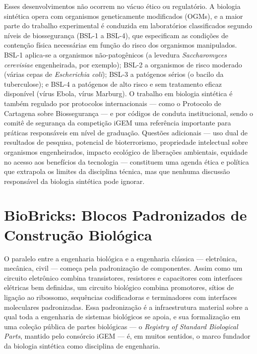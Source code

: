 Esses desenvolvimentos não ocorrem no vácuo ético ou regulatório. A biologia sintética opera com organismos geneticamente modificados (OGMs), e a maior parte do trabalho experimental é conduzida em laboratórios classificados segundo níveis de biossegurança (BSL-1 a BSL-4), que especificam as condições de contenção física necessárias em função do risco dos organismos manipulados. BSL-1 aplica-se a organismos não-patogênicos (a levedura \textit{Saccharomyces cerevisiae} engenheirada, por exemplo); BSL-2 a organismos de risco moderado (várias cepas de \textit{Escherichia coli}); BSL-3 a patógenos sérios (o bacilo da tuberculose); e BSL-4 a patógenos de alto risco e sem tratamento eficaz disponível (vírus Ebola, vírus Marburg). O trabalho em biologia sintética é também regulado por protocolos internacionais --- como o Protocolo de Cartagena sobre Biossegurança --- e por códigos de conduta institucional, sendo o comitê de segurança da competição iGEM uma referência importante para práticas responsáveis em nível de graduação. Questões adicionais --- uso dual de resultados de pesquisa, potencial de bioterrorismo, propriedade intelectual sobre organismos engenheirados, impacto ecológico de liberações ambientais, equidade no acesso aos benefícios da tecnologia --- constituem uma agenda ética e política que extrapola os limites da disciplina técnica, mas que nenhuma discussão responsável da biologia sintética pode ignorar.

\section{BioBricks: Blocos Padronizados de Construção Biológica}
\label{sec:14-biobricks}

O paralelo entre a engenharia biológica e a engenharia clássica --- eletrônica, mecânica, civil --- começa pela padronização de componentes. Assim como um circuito eletrônico combina transistores, resistores e capacitores com interfaces elétricas bem definidas, um circuito biológico combina promotores, sítios de ligação ao ribossomo, sequências codificadoras e terminadores com interfaces moleculares padronizadas. Essa padronização é a infraestrutura material sobre a qual toda a engenharia de sistemas biológicos se apoia, e sua formalização em uma coleção pública de partes biológicas --- o \emph{Registry of Standard Biological Parts}, mantido pelo consórcio iGEM --- é, em muitos sentidos, o marco fundador da biologia sintética como disciplina de engenharia.

